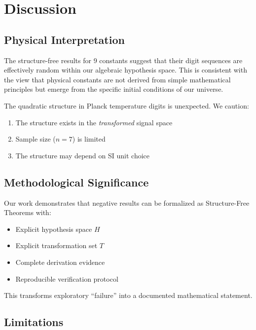 \documentclass[11pt,a4paper]{article}
\begin{document}
\section{Discussion}
\label{sec:discussion}

\subsection{Physical Interpretation}

The structure-free results for 9 constants suggest that their digit sequences are effectively random within our algebraic hypothesis space. This is consistent with the view that physical constants are not derived from simple mathematical principles but emerge from the specific initial conditions of our universe.

The quadratic structure in Planck temperature digits is unexpected. We caution:
\begin{enumerate}
    \item The structure exists in the \textit{transformed} signal space
    \item Sample size ($n = 7$) is limited
    \item The structure may depend on SI unit choice
\end{enumerate}

\subsection{Methodological Significance}

Our work demonstrates that negative results can be formalized as Structure-Free Theorems with:
\begin{itemize}
    \item Explicit hypothesis space $H$
    \item Explicit transformation set $T$
    \item Complete derivation evidence
    \item Reproducible verification protocol
\end{itemize}

This transforms exploratory ``failure'' into a documented mathematical statement.

\subsection{Limitations}
\end{document}
